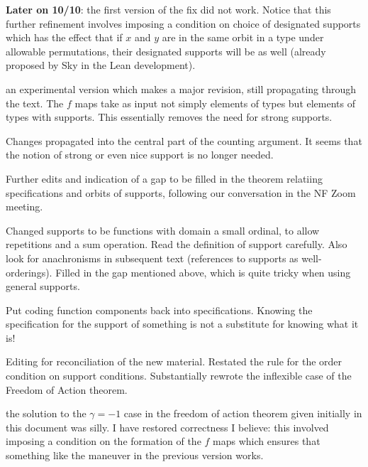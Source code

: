 \documentclass[112pt]{article}
\begin{document}
\begin{description}
{\bf Later on 10/10}:  the first version of the fix did not work.  Notice that this further refinement involves imposing a condition on choice of designated supports which has the effect that if $x$ and $y$ are in the same orbit in a type under allowable permutations, their designated supports will be as well (already proposed by Sky in the Lean development).

\item[11/7/2023:]  an experimental version which makes a major revision, still propagating through the text.  The $f$ maps take as input not
simply elements of types but elements of types with supports.  This essentially removes the need for strong supports.

\item[11/14/2023:]  Changes propagated into the central part of the counting argument.  It seems that the notion of strong or even nice support is no longer needed.

\item[11/14/2023 (after Zoom meeting):]  Further edits and indication of a gap to be filled in the theorem relatiing specifications and orbits of supports, following our conversation in the NF Zoom meeting.

\item[11/15/2023:]  Changed supports to be functions with domain a small ordinal, to allow repetitions and a sum operation.  Read the definition of support carefully.  Also look for anachronisms in subsequent text (references to supports as well-orderings).  Filled in the gap mentioned above, which is quite tricky when using general supports.

\item[11/15/2023, later:]  Put coding function components back into specifications.  Knowing the specification for the support of something is not a substitute for knowing what it is!

\item[11/16/2023:]  Editing for reconciliation of the new material.  Restated the rule for the order condition on support conditions.  Substantially rewrote
the inflexible case of the Freedom of Action theorem.

\item[11/16/2023:]  the solution to the $\gamma=-1$ case in the freedom of action theorem given initially in this document was silly.
I have restored correctness I believe:  this involved imposing a condition on the formation of the $f$ maps which ensures that something like the maneuver in the previous version works.


\end{description}
\end{document}
